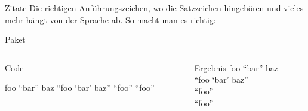 \begin{frame}[fragile]{Zitate}
  Die richtigen Anführungszeichen, wo die Satzzeichen hingehören und vieles mehr hängt von der Sprache ab.
  So macht man es richtig:
  \begin{block}{Paket}
    \begin{lstverbatim}
    \usepackage[autostyle]{csquotes}
    \end{lstverbatim}
  \end{block}
  \begin{columns}[onlytextwidth,t]
    \begin{column}{0.60\textwidth}
      \begin{block}{Code}
        \begin{lstverbatim}
        foo \enquote{bar} baz
        \enquote{foo \enquote{bar} baz}
         \enquote{foo}
         \enquote{foo}
        \end{lstverbatim}
      \end{block}
    \end{column}
    \begin{column}{0.36\textwidth}
      \begin{block}{Ergebnis}
        foo \enquote{bar} baz \\
        \enquote{foo \enquote{bar} baz} \\
         \enquote{foo} \\
         \enquote{foo} \\
      \end{block}
    \end{column}
  \end{columns}
\end{frame}
